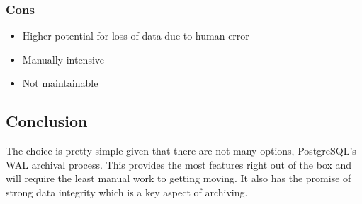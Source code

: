 \documentclass[draftclsnofoot,onecolumn,journal,letterpaper,compsoc,10pt]{IEEEtran}
\begin{document}
        \subsubsection{Cons}
        \begin{itemize}
            \item Higher potential for loss of data due to human error
            \item Manually intensive
            \item Not maintainable
        \end{itemize}
    
    \subsection{Conclusion}
    
    The choice is pretty simple given that there are not many options, PostgreSQL's WAL archival process.  This provides the most features right out of the box and will require the least manual work to getting moving.  It also has the promise of strong data integrity which is a key aspect of archiving.



\end{document}
